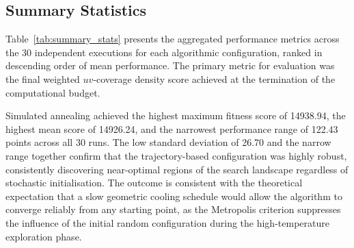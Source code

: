 \documentclass[conference]{IEEEtran}
\begin{document}
\subsection{Summary Statistics}
 
Table~\ref{tab:summary_stats} presents the aggregated performance metrics across the 30
independent executions for each algorithmic configuration, ranked in descending order of mean
performance. The primary metric for evaluation was the final weighted $uv$-coverage density
score achieved at the termination of the computational budget.
 
\begin{table}[htbp]
    \centering
    \caption{Summary statistics of the final objective function scores across 30 independent
             executions, ranked by mean performance.}
    \label{tab:summary_stats}
    \setlength{\tabcolsep}{4pt}
    \renewcommand{\arraystretch}{1.1}
    \footnotesize
\end{table}
 
Simulated annealing achieved the highest maximum fitness score of 14938.94, the highest mean
score of 14926.24, and the narrowest performance range of 122.43 points across all 30 runs.
The low standard deviation of 26.70 and the narrow range together confirm that the
trajectory-based configuration was highly robust, consistently discovering near-optimal regions
of the search landscape regardless of stochastic initialisation. The outcome is consistent
with the theoretical expectation that a slow geometric cooling schedule would allow the
algorithm to converge reliably from any starting point, as the Metropolis criterion suppresses
the influence of the initial random configuration during the high-temperature exploration phase.
 
\end{document}
